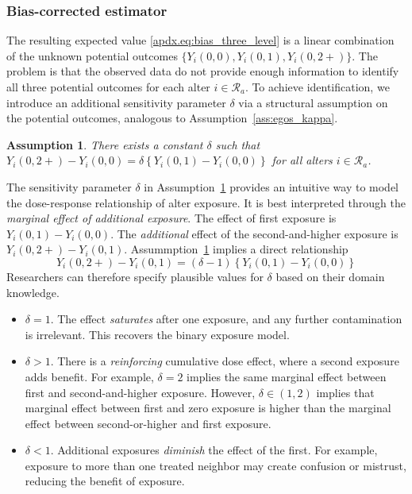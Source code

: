 \documentclass[11pt]{article}
\newtheorem{assumption}{Assumption}
\theoremstyle{definition}
\def \cR {\mathcal{R}}
\begin{document}
\subsubsection*{Bias-corrected estimator}
The resulting expected value \eqref{apdx.eq:bias_three_level} is a linear combination of the 
unknown potential outcomes $\{Y_i(0,0), Y_i(0,1), Y_i(0,2+)\}$.
The problem is that the observed data do not provide enough information to identify all three potential outcomes
for each alter $i \in \cR_a$.
To achieve identification, we introduce an additional sensitivity parameter $\delta$ via 
a structural assumption on the potential outcomes, analogous to Assumption~\ref{ass:egos_kappa}.
\begin{assumption}
    \label{ass:alters_delta}
    There exists a constant $\delta$ such that
    $Y_i(0, 2+) - Y_i(0, 0) = \delta \left\{Y_i(0, 1) - Y_i(0, 0)\right\}$ for all alters $i \in \cR_a$.
\end{assumption}
The sensitivity parameter $\delta$ in Assumption~\ref{ass:alters_delta} provides an intuitive way to model the dose-response relationship of alter exposure.
 It is best interpreted through the \emph{marginal effect of additional exposure}.
  The effect of first exposure is $Y_i(0, 1) - Y_i(0, 0)$.
  The \emph{additional} effect of the second-and-higher exposure is $Y_i(0, 2+) - Y_i(0, 1)$.
  Assummption~\ref{ass:alters_delta} implies a direct relationship
  \begin{equation*}
    Y_i(0, 2+) - Y_i(0, 1) = (\delta -1) \left\{Y_i(0, 1) - Y_i(0, 0)\right\}
  \end{equation*}
  Researchers can therefore specify plausible values for $\delta$ based on their domain knowledge.
\begin{itemize}
    \item $\delta = 1$. The effect \emph{saturates} after one exposure, and any further contamination is irrelevant. This recovers the binary exposure model.
    \item $\delta > 1$. There is a \emph{reinforcing} cumulative dose effect, where a second exposure adds benefit. 
        For example, $\delta=2$ implies the same marginal effect between first and second-and-higher exposure.
        However, $\delta \in (1,2)$ implies that marginal effect between first and zero exposure
        is higher than the marginal effect between second-or-higher and first exposure.
    \item $\delta < 1$. Additional exposures \emph{diminish} the effect of the first.
       For example, exposure to more than one treated neighbor may create confusion or mistrust, reducing the benefit of exposure. 
\end{itemize}
\end{document}
